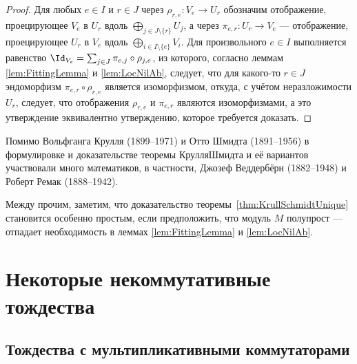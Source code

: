 \documentclass[
	extrafontsizes,
	11pt,
	hyphens,
]{memoir}
\begin{document}
\begin{proof}
Для любых \(e \in I\) и \(r \in J\) через \(\rho_{r,e} : V_e \to U_r\) обозначим отображение, проецирующее \(V_e\) в \(U_r\) вдоль \(\bigoplus_{j \in J \setminus \{r\}} U_j\), а через \(\pi_{e,r} : U_r \to V_e\) --- отображение, проецирующее \(U_r\) в \(V_e\) вдоль \(\bigoplus_{i \in I \setminus \{e\}} V_i\).
Для произвольного \(e \in I\)
выполняется равенство \(\Id_{V_e} = \sum_{j \in J} \pi_{e,j} \circ \rho_{j,e}\), из которого,
согласно леммам \ref{lem:FittingLemma} и \ref{lem:LocNilAb},
следует, что для какого-то \(r \in J\) эндоморфизм \(\pi_{e,r} \circ \rho_{r,e}\) является изоморфизмом, откуда, с учётом неразложимости \(U_r\), следует, что отображения \(\rho_{r,e}\) и \(\pi_{e,r}\) являются изоморфизмами, а это утверждение эквивалентно утверждению, которое требуется доказать.
\end{proof}

\begin{remark}
Помимо Вольфганга Крулля (1899--1971) и Отто Шмидта (1891--1956) в формулировке и доказательстве теоремы Крулля\namedash{}Шмидта и её вариантов участвовали много математиков, в частности, Джозеф Веддербёрн (1882--1948) и Роберт Ремак (1888--1942).
\end{remark}

\begin{remark}
Между прочим, заметим, что доказательство теоремы~\ref{thm:KrullSchmidtUnique} становится особенно простым, если предположить, что модуль \(M\) полупрост --- отпадает необходимость в леммах \ref{lem:FittingLemma} и \ref{lem:LocNilAb}.
\end{remark}



\chapter{Некоторые некоммутативные тождества}


\section{Тождества с мультипликативными коммутаторами}
\end{document}
